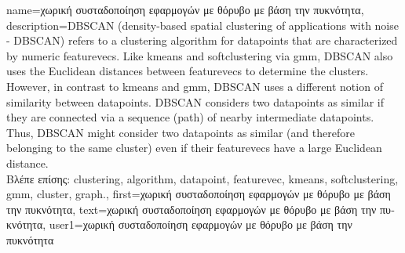 {name={\foreignlanguage{greek}{χωρική συσταδοποίηση εφαρμογών με θόρυβο με βάση την πυκνότητα}}, 
	description={DBSCAN 
		(density-based spatial clustering of applications with noise - DBSCAN)
		refers to a \gls{clustering} \gls{algorithm} for \gls{datapoint}s that are characterized by numeric \gls{featurevec}s. 
		Like \gls{kmeans} and \gls{softclustering} via \gls{gmm}, DBSCAN also uses the Euclidean 
		distances between \gls{featurevec}s to determine the \gls{cluster}s. However, in contrast to \gls{kmeans} 
		and \gls{gmm}, DBSCAN uses a different notion of similarity between \gls{datapoint}s. 
		DBSCAN considers two \gls{datapoint}s as similar if they are connected 
		via a sequence (path) of nearby intermediate \gls{datapoint}s. Thus, DBSCAN might consider 
		two \gls{datapoint}s as similar (and therefore belonging to the same cluster) even if 
		their \gls{featurevec}s have a large Euclidean distance.\\
		\foreignlanguage{greek}{Βλέπε επίσης:} \gls{clustering}, \gls{algorithm}, \gls{datapoint}, \gls{featurevec}, \gls{kmeans}, 
		\gls{softclustering}, \gls{gmm}, \gls{cluster}, \gls{graph}.},
	first={\foreignlanguage{greek}{χωρική συσταδοποίηση εφαρμογών με θόρυβο με βάση την πυκνότητα}},
	text={\foreignlanguage{greek}{χωρική συσταδοποίηση εφαρμογών με θόρυβο με βάση την πυκνότητα}},
	user1={\foreignlanguage{greek}{χωρική συσταδοποίηση εφαρμογών με θόρυβο με βάση την πυκνότητα}} %
}

